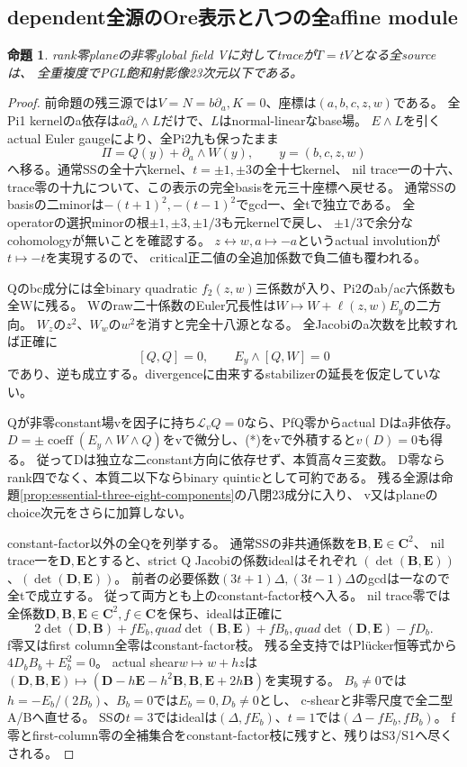 \documentclass[a4paper,11pt]{ltjsarticle}
\newtheorem{proposition}{命題}[section]
\theoremstyle{definition}
\newcommand{\CC}{\mathbf C}
\begin{document}
\subsection{dependent全源のOre表示と八つの全affine module}
\begin{proposition}\label{prop:plane-dependent-all-m-G}
rank零planeの非零global field Vに対してtraceが$T=tV$となる全sourceは、
全重複度でPGL飽和射影像23次元以下である。
\end{proposition}
\begin{proof}
前命題の残三源では$V=N=b\partial_a,K=0$、座標は$(a,b,c,z,w)$である。
全Pi1 kernelのa依存は$a\partial_a\wedge L$だけで、$L$はnormal-linearなbase場。
$E\wedge L$を引くactual Euler gaugeにより、全Pi2九も保ったまま
\[
 \Pi=Q(y)+\partial_a\wedge W(y),\qquad y=(b,c,z,w)
\]
へ移る。通常SSの全十六kernel、$t=\pm1,\pm3$の全十七kernel、
nil trace一の十六、trace零の十九について、この表示の完全basisを元三十座標へ戻せる。
通常SSのbasisの二minorは$-(t+1)^2,-(t-1)^2$でgcd一、全tで独立である。
全operatorの選択minorの根$\pm1,\pm3,\pm1/3$も元kernelで戻し、
$\pm1/3$で余分なcohomologyが無いことを確認する。
$z\leftrightarrow w,a\mapsto-a$というactual involutionが$t\mapsto-t$を実現するので、
critical正二値の全追加係数で負二値も覆われる。

Qのbc成分には全binary quadratic $f_2(z,w)$三係数が入り、Pi2のab/ac六係数も全Wに残る。
Wのraw二十係数のEuler冗長性は$W\mapsto W+\ell(z,w)E_y$の二方向。
$W_z$の$z^2$、$W_w$の$w^2$を消すと完全十八源となる。
全Jacobiのa次数を比較すれば正確に
\[
 [Q,Q]=0,\qquad E_y\wedge[Q,W]=0                                      \tag{*}
\]
であり、逆も成立する。divergenceに由来するstabilizerの延長を仮定していない。

Qが非零constant場vを因子に持ち$\mathcal L_vQ=0$なら、PfQ零からactual Dはa非依存。
$D=\pm\operatorname{coeff}(E_y\wedge W\wedge Q)$をvで微分し、(*)をvで外積すると$v(D)=0$も得る。
従ってDは独立な二constant方向に依存せず、本質高々三変数。
D零ならrank四でなく、本質二以下ならbinary quinticとして可約である。
残る全源は命題\ref{prop:essential-three-eight-components}の八閉23成分に入り、
v又はplaneのchoice次元をさらに加算しない。

constant-factor以外の全Qを列挙する。
通常SSの非共通係数を$\mathbf B,\mathbf E\in\CC^2$、
nil trace一を$\mathbf D,\mathbf E$とすると、strict Q Jacobiの係数idealはそれぞれ
$(\det(\mathbf B,\mathbf E))$、$(\det(\mathbf D,\mathbf E))$。
前者の必要係数$(3t+1)\Delta,(3t-1)\Delta$のgcdは一なので全tで成立する。
従って両方とも上のconstant-factor枝へ入る。
nil trace零では全係数$\mathbf D,\mathbf B,\mathbf E\in\CC^2,f\in\CC$を保ち、idealは正確に
\[
 2\det(\mathbf D,\mathbf B)+fE_b,quad
 \det(\mathbf B,\mathbf E)+fB_b,quad
 \det(\mathbf D,\mathbf E)-fD_b.
\]
f零又はfirst column全零はconstant-factor枝。
残る全支持ではPl\"ucker恒等式から$4D_bB_b+E_b^2=0$。
actual shear$w\mapsto w+hz$は
$(\mathbf D,\mathbf B,\mathbf E)\mapsto
(\mathbf D-h\mathbf E-h^2\mathbf B,\mathbf B,\mathbf E+2h\mathbf B)$を実現する。
$B_b\ne0$では$h=-E_b/(2B_b)$、$B_b=0$では$E_b=0,D_b\ne0$とし、
c-shearと非零尺度で全二型A/Bへ直せる。
SSの$t=3$ではidealは$(\Delta,fE_b)$、$t=1$では$(\Delta-fE_b,fB_b)$。
f零とfirst-column零の全補集合をconstant-factor枝に残すと、残りはS3/S1へ尽くされる。


\end{proof}
\end{document}
